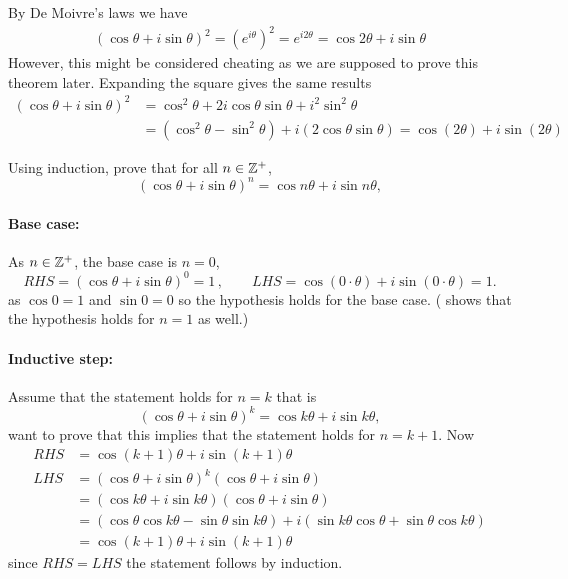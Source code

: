 \documentclass[a4paper, english, 12pt]{article} %
\begin{document}
\begin{answer}
  By De Moivre's laws we have
  \begin{align*}
    (\cos \theta + i \sin \theta)^2
    = (e^{i \theta})^2
    = e^{i 2 \theta}
    = \cos 2 \theta + i \sin \theta
  \end{align*}
  However, this might be considered cheating as we are supposed to prove this
  theorem later. Expanding the square gives the same results
  \begin{align*}
    (\cos \theta + i \sin \theta)^2
    & = \cos^2 \theta + 2 i \cos \theta \sin \theta + i^2 \sin^2 \theta \\
    & = (\cos^2 \theta - \sin^2 \theta) + i (2 \cos \theta \sin \theta)
    = \cos (2 \theta) + i \sin (2 \theta)
  \end{align*}
\end{answer}

\begin{subproblem}
  Using induction, prove that for all $n \in \mathbb{Z}^+$,
  \begin{equation*}
    (\cos \theta + i \sin \theta)^n = \cos n\theta + i \sin n\theta,
  \end{equation*}
\end{subproblem}

\begin{answer}
  \paragraph{Base case:} As $n \in \mathbb{Z}^+$, the base case is $n=0$,
  \begin{equation*}
    RHS = (\cos \theta + i \sin \theta)^0 = 1\,, \qquad
    LHS = \cos (0\cdot \theta) + i \sin (0\cdot \theta) = 1.
  \end{equation*}
  as $\cos 0 = 1$ and $\sin 0 = 0$ so the hypothesis holds for the base case.
  ( shows that the hypothesis holds for $n=1$ as well.)

  \paragraph{Inductive step:} Assume that the statement holds for $n=k$ that is
  \begin{equation*}
    (\cos \theta + i \sin \theta)^k = \cos k\theta + i \sin k\theta,
  \end{equation*}
  want to prove that this implies that the statement holds for $n=k+1$. Now
  \begin{align*}
    RHS & = \cos (k+1)\theta + i \sin (k+1) \theta \\
    LHS & = (\cos \theta + i \sin \theta)^{k} (\cos \theta + i \sin \theta) \\
        & = (\cos k \theta + i \sin k \theta) (\cos \theta + i \sin \theta) \\
        & = (\cos \theta \cos k \theta - \sin \theta \sin k \theta )+
          i (\sin k \theta \cos \theta + \sin \theta \cos k \theta ) \\
        & = \cos(k+1)\theta + i \sin(k+1) \theta
  \end{align*}
  since $RHS=LHS$ the statement follows by induction.
\end{answer}
\end{document}
